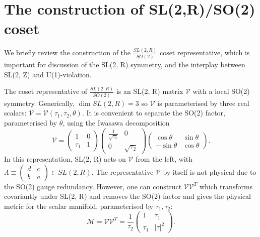 \section{The construction of SL(2,R)/SO(2) coset}

We briefly review the construction of the $\frac{SL(2, R)}{SO(2)}$ coset representative, which is important for discussion of the SL(2, R) symmetry, and the interplay between SL(2, Z) and U(1)-violation.

The coset representative of $\frac{SL(2, R)}{SO(2)}$ is an SL(2, R) matrix $\mathcal{V}$ with a local SO(2) symmetry. 
Generically, $\dim SL(2, R) = 3$ so $\mathcal{V}$ is parameterised by three real scalars: $\mathcal{V} = \mathcal{V}(\tau_1, \tau_2, \theta)$.
It is convenient to separate the SO(2) factor, parameterised by $\theta$, using the Iwasawa decomposition \cite{iwasawa1949}
\begin{equation}
\mathcal{V} = 
\begin{pmatrix}
1 & 0 \\
\tau_1 & 1
\end{pmatrix}
\begin{pmatrix}
\frac{1}{\sqrt{\tau_2}} & 0\\
0 & \sqrt{\tau_2}
\end{pmatrix}
\begin{pmatrix}
\cos\theta & \sin\theta\\
-\sin\theta & \cos\theta
\end{pmatrix}.
\label{Iwasawa-decomposition}
\end{equation}
In this representation, SL(2, R) acts on $\mathcal{V}$ from the left, with $\Lambda \equiv \begin{pmatrix}
d&c\\b&a\end{pmatrix} \in SL(2, R)$.
The representative $\mathcal{V}$ by itself is not physical due to the SO(2) gauge redundancy.
However, one can construct $\mathcal{V}\mathcal{V}^T$ which transforms covariantly under SL(2, R) and removes the SO(2) factor and gives the physical metric for the scalar manifold, parameterised by $\tau_1, \tau_2$:
\begin{equation}
\mathcal{M} = \mathcal{V}\mathcal{V}^T = \frac{1}{\tau_2}\begin{pmatrix}
1 & \tau_1\\
\tau_1 & |\tau|^2
\end{pmatrix}.
\end{equation}


